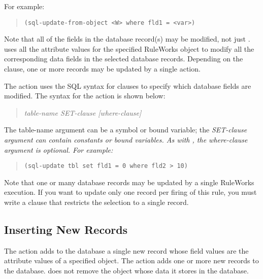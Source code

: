 For example:

\begin{quote}
\begin{verbatim}
(sql-update-from-object <W> where fld1 = <var>)
\end{verbatim}
\end{quote}

Note that all of the fields in the database record(s) may be modified,
not just .   uses all the
attribute values for the specified RuleWorks object to modify all the
corresponding data fields in the selected database records. Depending
on the  clause, one or more records may be updated by a
single  action.

The  action uses the SQL syntax for  clauses to
specify which database fields are modified. The syntax for the
 action is shown below:

\begin{quote}
   \it{table-name} \it{SET-clause} [\it{where-clause}]
\end{quote}

The table-name argument can be a symbol or bound variable; the
\it{SET-clause} argument can contain constants or bound variables. As with
, the \it{where-clause} argument is optional. For
example:

\begin{quote}
\begin{verbatim}
(sql-update tbl set fld1 = 0 where fld2 > 10)
\end{verbatim}
\end{quote}

Note that one or many database records may be updated by a single
RuleWorks  execution. If you want to update only one record
per firing of this rule, you must write a  clause that restricts
the selection to a single record.

\subsection{Inserting New Records}

The  action adds to the database a single
new record whose field values are the attribute values of a specified
object. The  action adds one or more new records to the
database.  does not remove the object whose
data it stores in the database.

